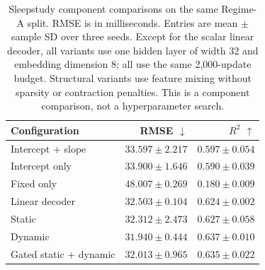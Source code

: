 \begin{table}[htbp]
\centering
\small
\caption{Sleepstudy component comparisons on the same Regime-A split. RMSE is in milliseconds. Entries are mean $\pm$ sample SD over three seeds. Except for the scalar linear decoder, all variants use one hidden layer of width 32 and embedding dimension 8; all use the same 2,000-update budget. Structural variants use feature mixing without sparsity or contraction penalties. This is a component comparison, not a hyperparameter search.}
\label{tab:ablation_comprehensive}
\begin{tabular}{lrr}
\toprule
Configuration & RMSE $\downarrow$ & $R^2$ $\uparrow$ \\
\midrule
Intercept + slope & $33.597 \pm 2.217$ & $0.597 \pm 0.054$ \\
Intercept only & $33.900 \pm 1.646$ & $0.590 \pm 0.039$ \\
Fixed only & $48.007 \pm 0.269$ & $0.180 \pm 0.009$ \\
Linear decoder & $32.503 \pm 0.104$ & $0.624 \pm 0.002$ \\
Static & $32.312 \pm 2.473$ & $0.627 \pm 0.058$ \\
Dynamic & $31.940 \pm 0.444$ & $0.637 \pm 0.010$ \\
Gated static + dynamic & $32.013 \pm 0.965$ & $0.635 \pm 0.022$ \\
\bottomrule
\end{tabular}
\end{table}
